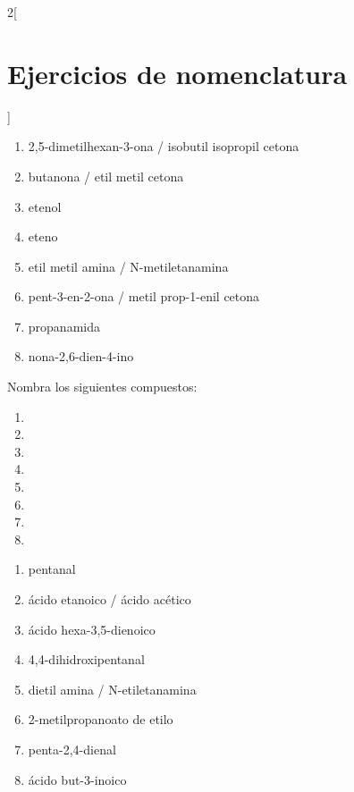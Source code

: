\documentclass[10pt]{article}
\begin{document}
\begin{multicols*}{2}[
  \section{Ejercicios de nomenclatura}
  ]
\begin{solution}
  \begin{enumerate}
    \item 2,5-dimetilhexan-3-ona / isobutil isopropil cetona
    \item butanona / etil metil cetona
    \item etenol
    \item eteno
    \item etil metil amina / N-metiletanamina
    \item pent-3-en-2-ona / metil prop-1-enil cetona
    \item propanamida
    \item nona-2,6-dien-4-ino
  \end{enumerate}
\end{solution}

\begin{exercise}[
    tags    = {orgánica,formulación,múltiple,2B},
    topics  = {química orgánica,formulación,nomenclatura},
    source  = {Química 2B SAN 2016, p391, e14},
  ]
  Nombra los siguientes compuestos:

  \begin{enumerate}
    \item {}
    \item {}
    \item {}
    \item {}
    \item {}
    \item {}
    \item {}
    \item {}
  \end{enumerate}
\end{exercise}

\begin{solution}
  \begin{enumerate}
    \item pentanal
    \item ácido etanoico / ácido acético
    \item ácido hexa-3,5-dienoico
    \item 4,4-dihidroxipentanal
    \item dietil amina / N-etiletanamina
    \item 2-metilpropanoato de etilo
    \item penta-2,4-dienal
    \item ácido but-3-inoico
  \end{enumerate}
\end{solution}



\end{multicols*}
\end{document}
